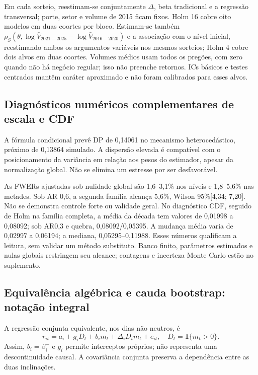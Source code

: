 \documentclass[12 pt]{article}
\begin{document}
Em cada sorteio, reestimam-se conjuntamente $\Delta$, beta tradicional
e a regressão transversal; porte, setor e volume de 2015 ficam fixos.
Holm 16 cobre oito modelos em duas coortes por bloco. Estimam-se também
$\rho_S(\theta,\log\bar V_{2021-2025}-\log\bar V_{2016-2020})$ e a
associação com o nível inicial, reestimando ambos os argumentos
variáveis nos mesmos sorteios; Holm 4 cobre dois alvos em duas coortes.
Volumes médios usam todos os pregões, com zero quando não há negócio
regular; isso não preenche retornos. ICs básicos e testes centrados
mantêm caráter aproximado e não foram calibrados para esses alvos.



\subsection{Diagnósticos numéricos complementares de escala e CDF}
A fórmula condicional prevê DP de 0,14061 no mecanismo heterocedástico,
próximo de 0,13864 simulado. A dispersão elevada é compatível com o
posicionamento da variância em relação aos pesos do estimador, apesar
da normalização global. Não se elimina um estresse por ser desfavorável.

As FWERs ajustadas sob nulidade global são 1,6--3,1\% nos níveis e 1,8--5,6\%
nas metades. Sob AR 0,6, a segunda família alcança 5,6\%, Wilson 95\%[4,34; 7,20].
Não se demonstra controle forte ou validade geral. No diagnóstico CDF,
seguido de Holm na família completa, a média da década tem valores
de 0,01998 a 0,08092; sob AR0,3 e quebra, 0,08092/0,05395.
A mudança média varia de 0,02997 a 0,06194; a mediana, 0,05295--0,11988.
Esses números qualificam a leitura, sem validar um método substituto.
Banco finito, parâmetros estimados e nulas globais restringem seu alcance;
contagens e incerteza Monte Carlo estão no suplemento.


\subsection{Equivalência algébrica e cauda bootstrap: notação integral}
A regressão
conjunta equivalente, nos dias não neutros, é
\begin{equation}
r_{it}=a_i+g_iD_t+b_im_t+\Delta_iD_tm_t+e_{it},
\quad D_t=\mathbf{1}\{m_t>0\}.
\end{equation}
Assim, $b_i=\beta_i^-$ e $g_i $ permite interceptos próprios;
não representa uma descontinuidade causal. A covariância conjunta
preserva a dependência entre as duas inclinações.
\end{document}
